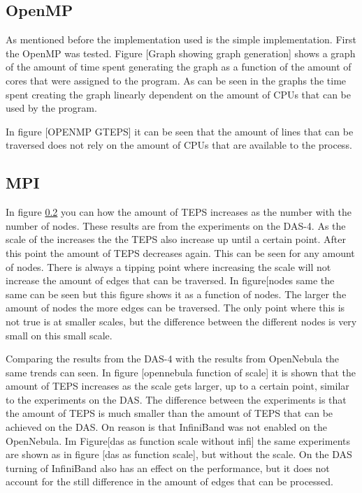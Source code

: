 \subsection{OpenMP}
As mentioned before the implementation used is the simple implementation. First the OpenMP was tested. Figure [Graph showing graph generation] shows a graph of the amount of time spent generating the graph as a function of the amount of cores that were assigned to the program. As can be seen in the graphs the time spent creating the graph linearly dependent on the amount of CPUs that can be used by the program. 

In figure [OPENMP GTEPS] it can be seen that the amount of lines that can be traversed does not rely on the amount of CPUs that are available to the process.

\subsection{MPI}
In figure \ref{} you can how the amount of TEPS increases as the number with the number of nodes. These results are from the experiments on the DAS-4. As the scale of the increases the the TEPS also increase up until a certain point. After this point the amount of TEPS decreases again. This can be seen for any  amount of nodes. There is always a tipping point where increasing the scale will not increase the amount of edges that can be traversed. In figure[nodes same the same can be seen but this figure shows it as a function of nodes. The larger the amount of nodes the more edges can be traversed. The only point where this is not true is at smaller scales, but the difference between the different nodes is very small on this small scale.

Comparing the results from the DAS-4 with the results from OpenNebula the same trends can seen. In figure [opennebula function of scale] it is shown that the amount of TEPS increases as the scale gets larger, up to a certain point, similar to the experiments on the DAS. The difference between the experiments is that the amount of TEPS is much smaller than the amount of TEPS that can be achieved on the DAS. On reason is that InfiniBand was not enabled on the OpenNebula. Im Figure[das as function scale without infi] the same experiments are shown as in  figure [das as function scale], but without the scale. On the DAS turning of  InfiniBand also has an effect on the performance, but it does not account for the still difference in the amount of edges that can be processed.

